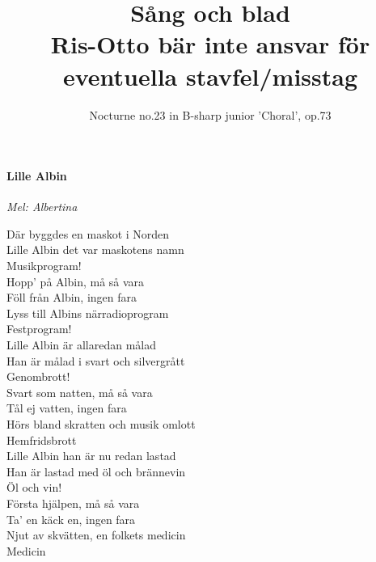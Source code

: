 \documentclass[12pt]{article}
\title{%
  Sång och blad \\%
  \large Ris-Otto bär inte ansvar för eventuella stavfel/misstag}
\author{Nocturne no.23 in B-sharp junior 'Choral', op.73}
\date{}
\begin{document}
\maketitle
\thispagestyle{empty}


\begin{minipage}[0,475\textwidth]
	\paragraph*{Lille Albin\\}
	\vspace{3px}
	\textit{Mel: Albertina}\\
\end{minipage}
	
\noindent
\begin{minipage}[0,475\textwidth]
	Där byggdes en maskot i Norden\\
Lille Albin det var maskotens namn\\
Musikprogram!\\

\noindent
Hopp' på Albin, må så vara\\
Föll från Albin, ingen fara\\
Lyss till Albins närradioprogram\\
Festprogram!\\

\noindent
Lille Albin är allaredan målad\\
Han är målad i svart och silvergrått\\
Genombrott!\\

\noindent
Svart som natten, må så vara\\
Tål ej vatten, ingen fara\\
Hörs bland skratten och musik omlott\\
Hemfridsbrott\\

\noindent
Lille Albin han är nu redan lastad\\
Han är lastad med öl och brännevin\\
Öl och vin!\\

\noindent
Första hjälpen, må så vara\\
Ta' en käck en, ingen fara\\
Njut av skvätten, en folkets medicin\\
Medicin\\


\end{minipage}
\end{document}
